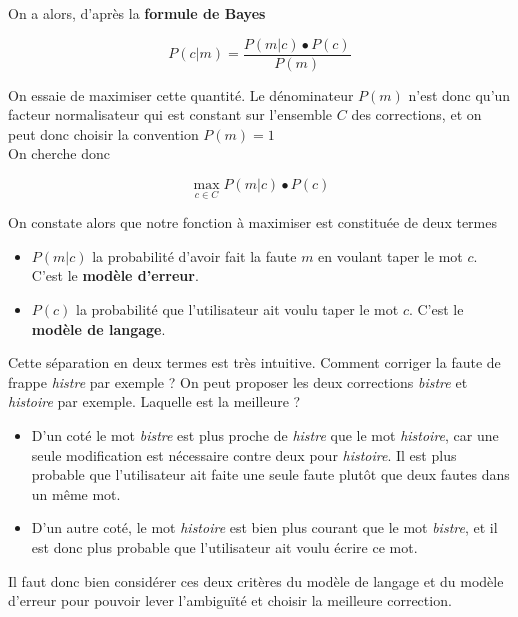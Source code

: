 \documentclass[10pt,a4paper]{article}
\begin{document}
On a alors, d'après la \textbf{formule de Bayes}

\begin{equation}
P(c|m) = \frac{P(m|c) \bullet P(c)}{P(m)}
\end{equation}

On essaie de maximiser cette quantité. Le dénominateur $P(m)$ n'est donc qu'un facteur normalisateur qui est constant sur l'ensemble $C$ des corrections, et on peut donc choisir la convention $P(m) = 1$\\

On cherche donc 

\begin{equation}
\max\limits_{c \in C} P(m|c) \bullet P(c)
\end{equation}

On constate alors que notre fonction à maximiser est constituée de deux termes\\

\begin{itemize}
\item $P(m|c)$ la probabilité d'avoir fait la faute $m$ en voulant taper le mot $c$. C'est le \textbf{modèle d'erreur}.
\item $P(c)$ la probabilité que l'utilisateur ait voulu taper le mot $c$. C'est le \textbf{modèle de langage}.\\
\end{itemize}

Cette séparation en deux termes est très intuitive. Comment corriger la faute de frappe \textit{histre} par exemple ? On peut proposer les deux corrections \textit{bistre} et \textit{histoire} par exemple. Laquelle est la meilleure ?\\

\begin{itemize}
\item D'un coté le mot \textit{bistre} est plus proche de \textit{histre} que le mot \textit{histoire}, car une seule modification est nécessaire contre deux pour \textit{histoire}. Il est plus probable que l'utilisateur ait faite une seule faute plutôt que deux fautes dans un même mot.
\item D'un autre coté, le mot \textit{histoire} est bien plus courant que le mot \textit{bistre}, et il est donc plus probable que l'utilisateur ait voulu écrire ce mot.\\
\end{itemize}

Il faut donc bien considérer ces deux critères du modèle de langage et du modèle d'erreur pour pouvoir lever l'ambiguïté et choisir la meilleure correction.
\end{document}

